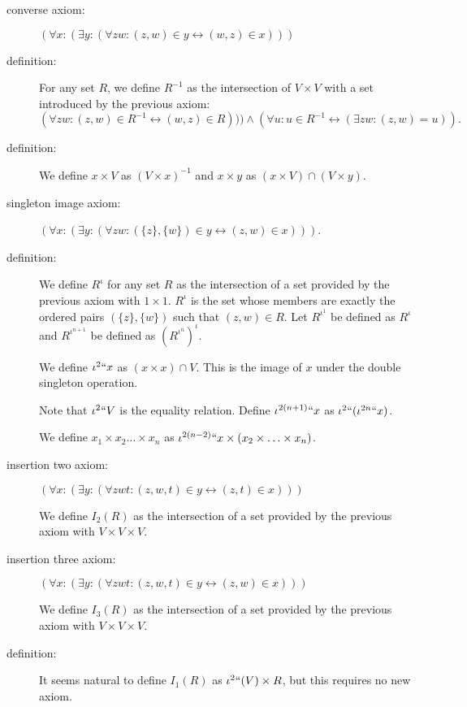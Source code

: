 \documentclass[112pt]{article}
\begin{document}
\begin{description}
\item[converse axiom:] $(\forall x:(\exists y:(\forall zw:(z,w)\in y \leftrightarrow (w,z) \in x)))$

\item[definition:]  For any set $R$, we define $R^{-1}$ as the intersection of $V \times V$ with a set introduced by the previous axiom:  $$(\forall zw:(z,w)\in R^{-1} \leftrightarrow (w,z) \in R))) \wedge (\forall u:u \in R^{-1} \leftrightarrow (\exists zw:(z,w)=u)).$$

\item[definition:]  We define $x \times V$ as $(V \times x)^{-1}$ and $x \times y$ as $(x \times V) \cap (V \times y)$.


\item[singleton image axiom:]  $(\forall x:(\exists y:(\forall zw:(\{z\},\{w\}) \in y \leftrightarrow (z,w) \in x)))$.  
\item[definition:]  We define $R^{\iota}$ for any set $R$ as the intersection of a set provided by the previous axiom with $1 \times 1$.  $R^{\iota}$ is the set whose members are exactly the ordered pairs $(\{z\},\{w\})$ such that $(z,w)\in R$.  Let $R^{\iota^1}$ be defined as $R^{\iota}$ and $R^{\iota^{n+1}}$ be defined as $(R^{\iota^n})^\iota$.

We define $\iota^2``x$ as $(x \times x) \cap V$.  This is the image of $x$ under the double singleton operation.

Note that $\iota^2``V$ is the equality relation.  Define $\iota^{2(n+1)}``x$ as $\iota^2``(\iota^{2n}``x)$.

We define $x_1 \times x_2 \ldots \times x_n$ as $\iota^{2(n-2)}``x \times (x_2 \times \ldots \times x_n)$.

\item[insertion two axiom:]  $(\forall x:(\exists y:(\forall zwt:(z,w,t) \in y \leftrightarrow (z,t) \in x)))$

We define $I_2(R)$ as the intersection of a set provided by the previous axiom with $V \times V \times V$.

\item[insertion three axiom:] $(\forall x:(\exists y:(\forall zwt:(z,w,t) \in y \leftrightarrow (z,w) \in x)))$

We define $I_3(R)$ as the intersection of a set provided by the previous axiom with $V \times V \times V$.

\item[definition:]  It seems natural to define $I_1(R)$ as $\iota^2``(V) \times R$, but this requires no new axiom.


\end{description}
\end{document}
